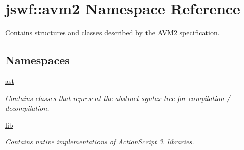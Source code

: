 \hypertarget{namespacejswf_1_1avm2}{\section{jswf\+:\+:avm2 Namespace Reference}
\label{namespacejswf_1_1avm2}
}


Contains structures and classes described by the A\+V\+M2 specification.  


\subsection*{Namespaces}
\begin{DoxyCompactItemize}
\item 
 \hyperlink{namespacejswf_1_1avm2_1_1ast}{ast}
\begin{DoxyCompactList}\small\item\em Contains classes that represent the abstract syntax-\/tree for compilation / decompilation. \end{DoxyCompactList}\item 
 \hyperlink{namespacejswf_1_1avm2_1_1lib}{lib}
\begin{DoxyCompactList}\small\item\em Contains native implementations of Action\+Script 3. libraries. \end{DoxyCompactList}\end{DoxyCompactItemize}
